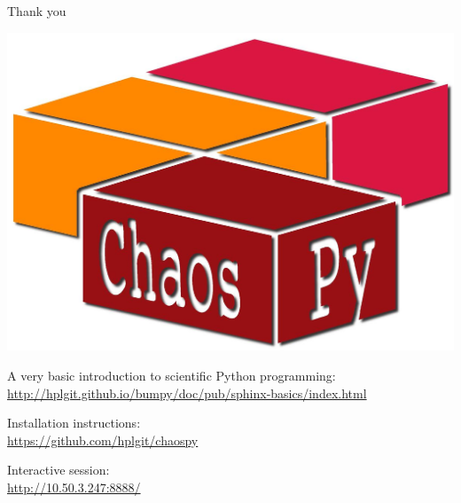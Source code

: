 \documentclass{beamer}
\begin{document}
 
\begin{frame}[fragile]{Thank you}
  \begin{center}
     \includegraphics[width=.5\textwidth]{chaospy_logo.jpg}
  \end{center}
    \begin{alert}{A very basic introduction to scientific Python programming:}
    \scriptsize
      \href{http://hplgit.github.io/bumpy/doc/pub/sphinx-basics/index.html}{http://hplgit.github.io/bumpy/doc/pub/sphinx-basics/index.html}\\
  \end{alert}
  \begin{alert}{Installation instructions:}\\
  \scriptsize
      \href{https://github.com/hplgit/chaospy}{https://github.com/hplgit/chaospy}\\
  \end{alert}
    \begin{alert}{Interactive session:}\\
  \scriptsize
\href{http://10.50.3.247:8888/}{http://10.50.3.247:8888/}

  \end{alert}
\end{frame}
\end{document}

